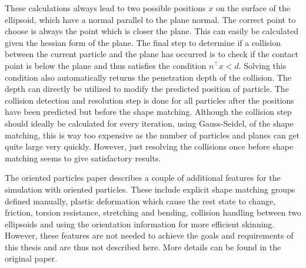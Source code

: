 These calculations always lead to two possible positions $x$ on the surface of the ellipsoid, which have a normal parallel to the plane normal. The correct point to choose is always the point which is closer the plane. This can easily be calculated given the hessian form of the plane. The final step to determine if a collision between the current particle and the plane has occurred is to check if the contact point is below the plane and thus satisfies the condition $n^\top x < d$. Solving this condition also automatically returns the penetration depth of the collision. The depth can directly be utilized to modify the predicted position of particle. The collision detection and resolution step is done for all particles after the positions have been predicted but before the shape matching. Although the collision step should ideally be calculated for every iteration, using Gauss-Seidel, of the shape matching, this is way too expensive as the number of particles and planes can get quite large very quickly. However, just resolving the collisions once before shape matching seems to give satisfactory results.

The oriented particles paper describes a couple of additional features for the simulation with oriented particles. These include explicit shape matching groups defined manually, plastic deformation which cause the rest state to change, friction, torsion resistance, stretching and bending, collision handling between two ellipsoids and using the orientation information for more efficient skinning. However, these features are not needed to achieve the goals and requirements of this thesis and are thus not described here. More details can be found in the original paper.